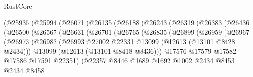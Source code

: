 \begin{lexlean}{RustCore}
\begin{coremodule}
                        (@25935
                          (@25994
                            (@26071
                              (@26135
                                (@26188
                                  (@26243
                                    (@26319
                                      (@26383
                                        (@26436
                                          (@26500
                                            (@26567
                                              (@26631
                                                (@26701
                                                  (@26765
                                                    (@26835
                                                      (@26899
                                                        (@26959
                                                          (@26967
                                                            (@26973
                                                              (@26983
                                                                (@26993
                                                                  @27002
                                                                  @22331
                                                                  @13099
                                                                  (@12613 (@13101 @8428 @2434)))
                                                                @13099
                                                                (@12613 (@13101 @8418 @8436)))
                                                              @17576
                                                              @17579
                                                              @17582
                                                              @17586
                                                              @17591
                                                              @22351)
                                                            (@22357
                                                              @8446
                                                              @1689
                                                              @1692
                                                              @1002
                                                              @2434
                                                              @8453
                                                              @2434
                                                              @8458

\end{coremodule}
\end{lexlean}
